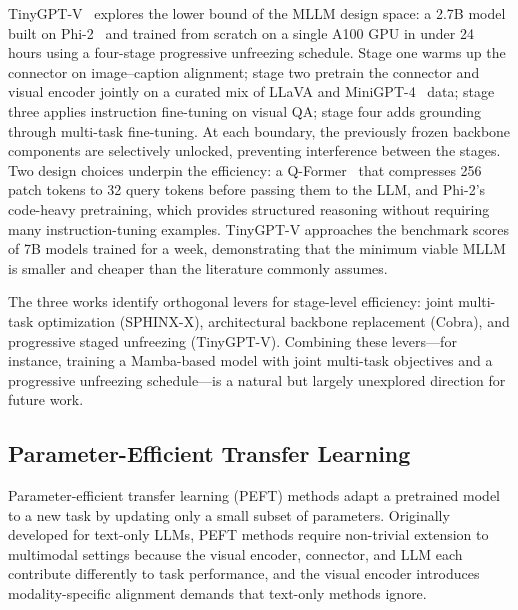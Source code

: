 TinyGPT-V~\cite{Yuan202316862} explores the lower bound of the MLLM design space: a 2.7B model built on Phi-2~\cite{Li202312048} and trained from scratch on a single A100 GPU in under 24 hours using a four-stage progressive unfreezing schedule. Stage one warms up the connector on image--caption alignment; stage two pretrain the connector and visual encoder jointly on a curated mix of LLaVA and MiniGPT-4~\cite{Zhu202302506} data; stage three applies instruction fine-tuning on visual QA; stage four adds grounding through multi-task fine-tuning. At each boundary, the previously frozen backbone components are selectively unlocked, preventing interference between the stages. Two design choices underpin the efficiency: a Q-Former~\cite{Li202301596} that compresses 256 patch tokens to 32 query tokens before passing them to the LLM, and Phi-2's code-heavy pretraining, which provides structured reasoning without requiring many instruction-tuning examples. TinyGPT-V approaches the benchmark scores of 7B models trained for a week, demonstrating that the minimum viable MLLM is smaller and cheaper than the literature commonly assumes.

The three works identify orthogonal levers for stage-level efficiency: joint multi-task optimization (SPHINX-X), architectural backbone replacement (Cobra), and progressive staged unfreezing (TinyGPT-V). Combining these levers---for instance, training a Mamba-based model with joint multi-task objectives and a progressive unfreezing schedule---is a natural but largely unexplored direction for future work.

\subsection{Parameter-Efficient Transfer Learning}
\label{subsec:peft}

Parameter-efficient transfer learning (PEFT) methods adapt a pretrained model to a new task by updating only a small subset of parameters. Originally developed for text-only LLMs, PEFT methods require non-trivial extension to multimodal settings because the visual encoder, connector, and LLM each contribute differently to task performance, and the visual encoder introduces modality-specific alignment demands that text-only methods ignore.

